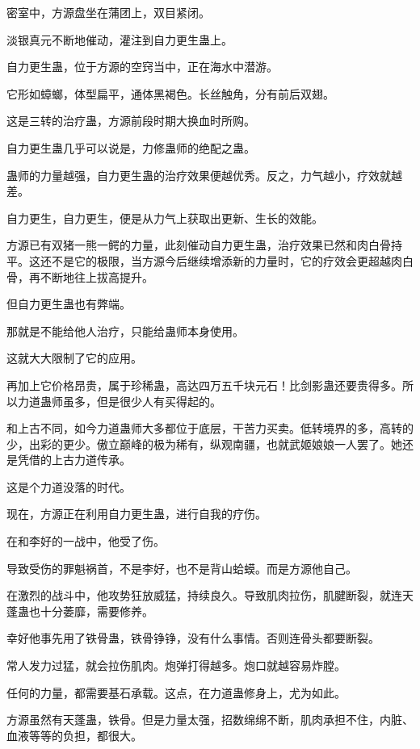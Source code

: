 
\begin{this_body}

密室中，方源盘坐在蒲团上，双目紧闭。

淡银真元不断地催动，灌注到自力更生蛊上。

自力更生蛊，位于方源的空窍当中，正在海水中潜游。

它形如蟑螂，体型扁平，通体黑褐色。长丝触角，分有前后双翅。

这是三转的治疗蛊，方源前段时期大换血时所购。

自力更生蛊几乎可以说是，力修蛊师的绝配之蛊。

蛊师的力量越强，自力更生蛊的治疗效果便越优秀。反之，力气越小，疗效就越差。

自力更生，自力更生，便是从力气上获取出更新、生长的效能。

方源已有双猪一熊一鳄的力量，此刻催动自力更生蛊，治疗效果已然和肉白骨持平。这还不是它的极限，当方源今后继续增添新的力量时，它的疗效会更超越肉白骨，再不断地往上拔高提升。

但自力更生蛊也有弊端。

那就是不能给他人治疗，只能给蛊师本身使用。

这就大大限制了它的应用。

再加上它价格昂贵，属于珍稀蛊，高达四万五千块元石！比剑影蛊还要贵得多。所以力道蛊师虽多，但是很少人有买得起的。

和上古不同，如今力道蛊师大多都位于底层，干苦力买卖。低转境界的多，高转的少，出彩的更少。傲立巅峰的极为稀有，纵观南疆，也就武姬娘娘一人罢了。她还是凭借的上古力道传承。

这是个力道没落的时代。

现在，方源正在利用自力更生蛊，进行自我的疗伤。

在和李好的一战中，他受了伤。

导致受伤的罪魁祸首，不是李好，也不是背山蛤蟆。而是方源他自己。

在激烈的战斗中，他攻势狂放威猛，持续良久。导致肌肉拉伤，肌腱断裂，就连天蓬蛊也十分萎靡，需要修养。

幸好他事先用了铁骨蛊，铁骨铮铮，没有什么事情。否则连骨头都要断裂。

常人发力过猛，就会拉伤肌肉。炮弹打得越多。炮口就越容易炸膛。

任何的力量，都需要基石承载。这点，在力道蛊修身上，尤为如此。

方源虽然有天蓬蛊，铁骨。但是力量太强，招数绵绵不断，肌肉承担不住，内脏、血液等等的负担，都很大。


\end{this_body}
